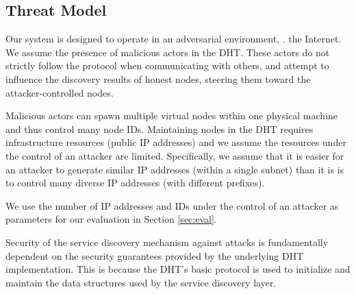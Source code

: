 \subsection{Threat Model}

Our system is designed to operate in an adversarial environment, \ie. the Internet. We assume the presence of malicious actors in the DHT. These actors do not strictly follow the protocol when communicating with others, and attempt to influence the discovery results of honest nodes, steering them toward the attacker-controlled nodes.

Malicious actors can spawn multiple virtual nodes within one physical machine and thus control many node IDs. Maintaining nodes in the DHT requires infrastructure resources (public IP addresses) and we assume the resources under the control of an attacker are limited. Specifically, we assume that it is easier for an attacker to generate similar IP addresses (within a single subnet) than it is is to control many diverse IP addresses (with different prefixes).

We use the number of IP addresses and IDs under the control of an attacker as parameters for our evaluation in Section \ref{sec:eval}.

Security of the service discovery mechanism against attacks is fundamentally dependent on the security guarantees provided by the underlying DHT implementation. This is because the DHT's basic protocol is used to initialize and maintain the data structures used by the service discovery layer.


%
